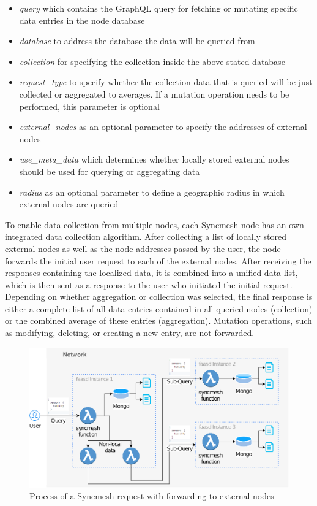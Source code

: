 \documentclass[conference]{IEEEtran}
\begin{document}
\begin{itemize}
    \item \textit{query} which contains the GraphQL query for fetching or mutating specific data entries in the node database
    \item \textit{database} to address the database the data will be queried from
    \item \textit{collection} for specifying the collection inside the above stated database
    \item \textit{request\_type} to specify whether the collection data that is queried will be just collected or aggregated to averages. If a mutation operation needs to be performed, this parameter is optional
    \item \textit{external\_nodes} as an optional parameter to specify the addresses of external nodes
    \item \textit{use\_meta\_data} which determines whether locally stored external nodes should be used for querying or aggregating data
    \item \textit{radius} as an optional parameter to define a geographic radius in which external nodes are queried
\end{itemize}

To enable data collection from multiple nodes, each Syncmesh node has an own integrated data collection algorithm. After collecting a list of locally stored external nodes as well as the node addresses passed by the user, the node forwards the initial user request to each of the external nodes. After receiving the responses containing the localized data, it is combined into a unified data list, which is then sent as a response to the user who initiated the initial request. Depending on whether aggregation or collection was selected, the final response is either a complete list of all data entries contained in all queried nodes (collection) or the combined average of these entries (aggregation). Mutation operations, such as modifying, deleting, or creating a new entry, are not forwarded.

\begin{figure}[!h]
	\centering
		\includegraphics[width=\linewidth]{img/network_request_bigger.eps}
	\caption{Process of a Syncmesh request with forwarding to external nodes}
    \label{fig:syncmesh-request} %
\end{figure}
\end{document}

